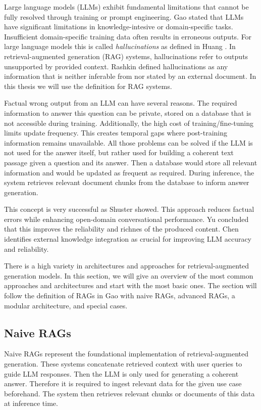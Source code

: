 Large language models (LLMs) exhibit fundamental limitations that cannot be fully resolved through training or prompt engineering. Gao \cite{Gao.18.12.2023} stated that LLMs have significant limitations in knowledge-intesive or domain-specific tasks. Insufficient domain-specific training data often results in erroneous outputs. For large language models this is called \textit{hallucinations} as defined in Huang \cite{Huang.2023}. In retrieval-augmented generation (RAG) systems, hallucinations refer to outputs unsupported by provided context. Rashkin \cite{Rashkin.} defined hallucinations as any information that is neither inferable from nor stated by an external document. In this thesis we will use the definition for RAG systems. 

Factual wrong output from an LLM can have several reasons. The required information to answer this question can be private, stored on a database that is not accessible during training. Additionally, the high cost of training/fine-tuning limits update frequency. This creates temporal gaps where post-training information remains unavailable. All those problems can be solved if the LLM is not used for the answer itself, but rather used for building a coherent text passage given a question and its answer. Then a database would store all relevant information and would be updated as frequent as required. During inference, the system retrieves relevant document chunks from the database to inform answer generation.

This concept is very successful as Shuster \cite{Shuster.} showed. This approach reduces factual errors while enhancing open-domain conversational performance. Yu \cite{Yu.2024} concluded that this improves the reliability and richnes of the produced content. Chen \cite{Chen.2024} identifies external knowledge integration as crucial for improving LLM accuracy and reliability.

There is a high variety in architectures and approaches for retrieval-augmented generation models. In this section, we will give an overview of the most common approaches and architectures and start with the most basic ones. The section will follow the definition of RAGs in Gao \cite{Gao.18.12.2023} with naive RAGs, advanced RAGs, a modular architecture, and special cases. 

\subsection{Naive RAGs}
\label{sec:naive_rags}
Naive RAGs represent the foundational implementation of retrieval-augmented generation. These systems concatenate retrieved context with user queries to guide LLM responses. Then the LLM is only used for generating a coherent answer. Therefore it is required to ingest relevant data for the given use case beforehand. The system then retrieves relevant chunks or documents of this data at inference time. 


